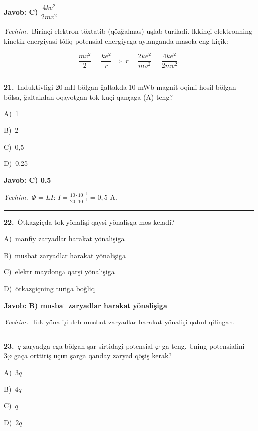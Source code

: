 \documentclass[11pt,a4paper]{article}
\newcommand{\opt}[2]{\hspace*{4mm}#1)\ #2\par}
\begin{document}
\noindent\colorbox{gray!12}{\parbox{\dimexpr\linewidth-2\fboxsep}{\textbf{Javob: C) $\dfrac{4ke^2}{2mv^2}$}}}\par\smallskip
\noindent\textit{Yechim.}\ Birinçi elektron töxtatib (qözğalmas) uşlab turiladi. Ikkinçi elektronning kinetik energiyasi töliq potensial energiyaga aylanganda masofa eng kiçik:\par
\[\frac{mv^2}{2}=\frac{ke^2}{r}\ \Rightarrow\ r=\frac{2ke^2}{mv^2}=\frac{4ke^2}{2mv^2}.\]\par\medskip\hrule\medskip
{}\noindent\begin{minipage}{\linewidth}
\textbf{21.}\ Induktivligi 20 mH bölgan ğaltakda 10 mWb magnit oqimi hosil bölgan bölsa, ğaltakdan oqayotgan tok kuçi qançaga (A) teng?\par\smallskip
\opt{A}{1}
\opt{B}{2}
\opt{C}{0,5}
\opt{D}{0,25}
\end{minipage}\vspace{2pt}\par
\noindent\colorbox{gray!12}{\parbox{\dimexpr\linewidth-2\fboxsep}{\textbf{Javob: C) 0,5}}}\par\smallskip
\noindent\textit{Yechim.}\ $\Phi=LI$: $I=\frac{10\cdot10^{-3}}{20\cdot10^{-3}}=0{,}5$ A.\par\par\medskip\hrule\medskip
{}\noindent\begin{minipage}{\linewidth}
\textbf{22.}\ Ötkazgiçda tok yönalişi qaysi yönalişga mos keladi?\par\smallskip
\opt{A}{manfiy zaryadlar harakat yönalişiga}
\opt{B}{musbat zaryadlar harakat yönalişiga}
\opt{C}{elektr maydonga qarşi yönalişiga}
\opt{D}{ötkazgiçning turiga boğliq}
\end{minipage}\vspace{2pt}\par
\noindent\colorbox{gray!12}{\parbox{\dimexpr\linewidth-2\fboxsep}{\textbf{Javob: B) musbat zaryadlar harakat yönalişiga}}}\par\smallskip
\noindent\textit{Yechim.}\ Tok yönalişi deb musbat zaryadlar harakat yönalişi qabul qilingan.\par\par\medskip\hrule\medskip
{}\noindent\begin{minipage}{\linewidth}
\textbf{23.}\ $q$ zaryadga ega bölgan şar sirtidagi potensial $\varphi$ ga teng. Uning potensialini $3\varphi$ gaça orttiriş uçun şarga qanday zaryad qöşiş kerak?\par\smallskip
\opt{A}{$3q$}
\opt{B}{$4q$}
\opt{C}{$q$}
\opt{D}{$2q$}
\end{minipage}\vspace{2pt}\par
\end{document}
